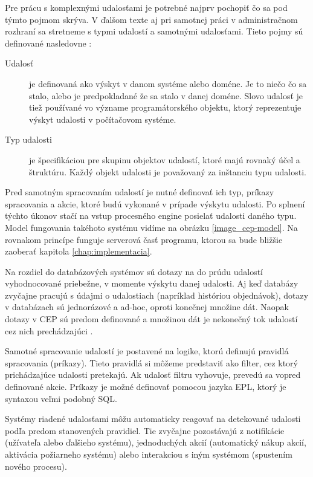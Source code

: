 	Pre prácu s komplexnými udalosťami je potrebné najprv pochopiť čo sa pod týmto pojmom skrýva. V ďalšom texte aj pri samotnej práci v administračnom rozhraní sa stretneme s typmi udalostí a samotnými udalosťami. Tieto pojmy sú definované nasledovne \cite{etzion2011event}:
	
	\begin{description}
		\item[Udalosť] je definovaná ako výskyt v danom systéme alebo doméne. Je to niečo čo sa stalo, alebo je predpokladané že sa stalo v danej doméne. Slovo udalosť je tiež používané vo význame programátorského objektu, ktorý reprezentuje výskyt udalosti v počítačovom systéme.
		
		\item[Typ udalosti] je špecifikáciou pre skupinu objektov udalostí, ktoré majú rovnaký účel a štruktúru. Každý objekt udalosti je považovaný za inštanciu typu udalosti.
	\end{description}

	Pred samotným spracovaním udalostí je nutné definovať ich typ, príkazy spracovania a akcie, ktoré budú vykonané v prípade výskytu udalosti. Po splnení týchto úkonov stačí na vstup procesného engine posielať udalosti daného typu. Model fungovania takéhoto systému vidíme na obrázku \ref{image_cep-model}. Na rovnakom princípe funguje serverová časť programu, ktorou sa bude bližšie zaoberať kapitola \ref{chap:implementacia}.
	
	Na rozdiel do databázových systémov sú dotazy na do prúdu udalostí vyhodnocované priebežne, v momente výskytu danej udalosti. Aj keď databázy zvyčajne pracujú s údajmi o udalostiach (napríklad históriou objednávok), dotazy v databázach sú jednorázové a ad-hoc, oproti konečnej množine dát. Naopak dotazy v CEP sú predom definované a množinou dát je nekonečný tok udalostí cez nich prechádzajúci \cite{web:ceptranslated}.
		
	Samotné spracovanie udalostí je postavené na logike, ktorú definujú pravidlá spracovania (príkazy). Tieto pravidlá si môžeme predstaviť ako filter, cez ktorý prichádzajúce udalosti pretekajú. Ak udalosť filtru vyhovuje, prevedú sa vopred definované akcie. Príkazy je možné definovať pomocou jazyka EPL, ktorý je syntaxou veľmi podobný SQL.
	
	Systémy riadené udalosťami môžu automaticky reagovať na detekované udalosti podľa predom stanovených pravidiel. Tie zvyčajne pozostávajú z notifikácie (užívateľa alebo ďalšieho systému), jednoduchých akcií (automatický nákup akcií, aktivácia požiarneho systému) alebo interakciou s iným systémom (spustením nového procesu).


